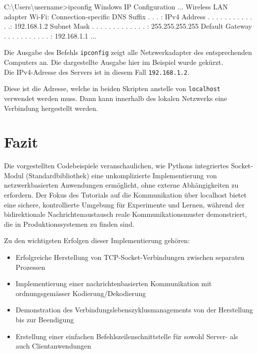 \documentclass[
  nswissgerman,
  a4paper,
  DIV=11,
  numbers=noendperiod,
  ngerman]{scrreprt}
\newenvironment{Shaded}{\begin{snugshade}}{\end{snugshade}}
\newcommand{\ExtensionTok}[1]{\textcolor[rgb]{0.00,0.23,0.31}{#1}}
\newcommand{\NormalTok}[1]{\textcolor[rgb]{0.00,0.23,0.31}{#1}}
\newcommand{\OperatorTok}[1]{\textcolor[rgb]{0.37,0.37,0.37}{#1}}
\providecommand{\tightlist}{%
  \setlength{\itemsep}{0pt}\setlength{\parskip}{0pt}}
\begin{document}
\begin{Shaded}
\begin{Highlighting}[numbers=left,,]
\ExtensionTok{C:\textbackslash{}Users\textbackslash{}username}\OperatorTok{\textgreater{}}\NormalTok{ipconfig}
\ExtensionTok{Windows}\NormalTok{ IP Configuration}
\ExtensionTok{...}
\ExtensionTok{Wireless}\NormalTok{ LAN adapter Wi{-}Fi:}
   \ExtensionTok{Connection{-}specific}\NormalTok{ DNS Suffix  . . . :}
   \ExtensionTok{IPv4}\NormalTok{ Address . . . . . . . . . . . . .: 192.168.1.2}
   \ExtensionTok{Subnet}\NormalTok{ Mask . . . . . . . . . . . . . : 255.255.255.255}
   \ExtensionTok{Default}\NormalTok{ Gateway . . . . . . . . . . . : 192.168.1.1}
\ExtensionTok{...}
\end{Highlighting}
\end{Shaded}

Die Ausgabe des Befehls \texttt{ipconfig} zeigt alle Netzwerkadapter des
entsprechenden Computers an. Die dargestellte Ausgabe hier im Beispiel
wurde gekürzt.\\
Die IPv4-Adresse des Servers ist in diesem Fall \texttt{192.168.1.2}.

Diese ist die Adresse, welche in beiden Skripten anstelle von
\texttt{localhost} verwendet werden muss. Dann kann innerhalb des
lokalen Netzwerks eine Verbindung hergestellt werden.

\section{Fazit}\label{fazit}

Die vorgestellten Codebeispiele veranschaulichen, wie Pythons
integriertes Socket-Modul (Standardbibliothek) eine unkomplizierte
Implementierung von netzwerkbasierten Anwendungen ermöglicht, ohne
externe Abhängigkeiten zu erfordern. Der Fokus des Tutorials auf die
Kommunikation über localhost bietet eine sichere, kontrollierte Umgebung
für Experimente und Lernen, während der bidirektionale
Nachrichtenaustausch reale Kommunikationsmuster demonstriert, die in
Produktionssystemen zu finden sind.

Zu den wichtigsten Erfolgen dieser Implementierung gehören:

\begin{itemize}
\tightlist
\item
  Erfolgreiche Herstellung von TCP-Socket-Verbindungen zwischen
  separaten Prozessen
\item
  Implementierung einer nachrichtenbasierten Kommunikation mit
  ordnungsgemässer Kodierung/Dekodierung
\item
  Demonstration des Verbindungslebenszyklusmanagements von der
  Herstellung bis zur Beendigung
\item
  Erstellung einer einfachen Befehlszeilenschnittstelle für sowohl
  Server- als auch Clientanwendungen
\end{itemize}
\end{document}

